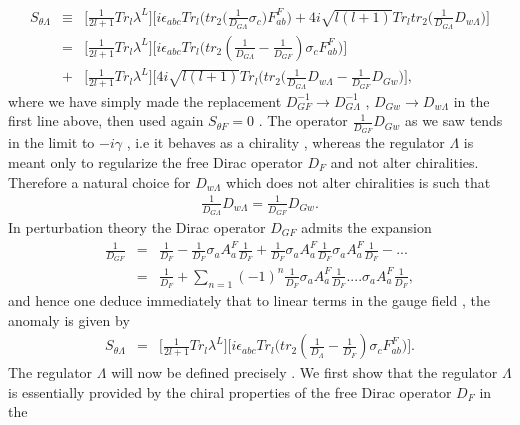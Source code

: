 \documentclass[a4paper,10pt]{article}
\begin{document}
\begin{eqnarray}
S_{\theta
\Lambda}&{\equiv}&\bigg[\frac{1}{2l+1}Tr_l{\lambda}^{L}\bigg]\bigg[i{\epsilon}_{abc}Tr_{l}\bigg(tr_2\big(\frac{1}{D_{G \Lambda }}{\sigma}_c)F_{ab}^F\bigg)+4i\sqrt{l(l+1)}Tr_ltr_2\big(\frac{1}{D_{G \Lambda }}D_{w \Lambda }\big)\bigg]\nonumber\\
&=&\bigg[\frac{1}{2l+1}Tr_l{\lambda}^{L}\bigg]\bigg[i{\epsilon}_{abc}Tr_{l}\bigg(tr_2(\frac{1}{D_{G \Lambda }}-\frac{1}{D_{GF}}){\sigma}_cF_{ab}^F\bigg)\bigg]\nonumber\\
&+&\bigg[\frac{1}{2l+1}Tr_l{\lambda}^{L}\bigg]\bigg[4i\sqrt{l(l+1)}Tr_{l}\bigg(tr_2\bigg(\frac{1}{D_{G\Lambda}}D_{w\Lambda}-\frac{1}{D_{GF}}D_{Gw}\bigg)\bigg],
\label{Lamb}\nonumber
\end{eqnarray}
where we have simply made the replacement
$D_{GF}^{-1}{\longrightarrow}D_{G\Lambda}^{-1}$ , $D_{Gw}{\longrightarrow}D_{w\Lambda }$ in the first line
above, then used again $S_{\theta F}=0$ . The operator $\frac{1}{D_{GF}}D_{Gw}$ as we saw tends in the limit to $-i{\gamma}$ , i.e it behaves as a chirality , whereas the regulator $\Lambda$ is meant only to regularize the free Dirac operator $D_F$ and not  alter chiralities. Therefore a natural choice for $D_{w\Lambda}$ which does not alter chiralities is such that
\begin{eqnarray}
\frac{1}{D_{G\Lambda }}D_{w\Lambda}=\frac{1}{D_{GF}}D_{Gw}.\nonumber
\end{eqnarray}
In perturbation theory
the Dirac operator $D_{GF}$ admits the expansion
\begin{eqnarray}
\frac{1}{D_{GF}}&=&\frac{1}{D_{F}}-\frac{1}{D_F}{\sigma}_aA_a^F\frac{1}{D_F}+\frac{1}{D_F}{\sigma}_aA_a^F\frac{1}{D_F}{\sigma}_aA_a^F\frac{1}{D_F}-...\nonumber\\
&=&\frac{1}{D_F}+\sum_{n=1}(-1)^n\frac{1}{D_F}{\sigma}_aA_a^F\frac{1}{D_F}....{\sigma}_aA_a^F\frac{1}{D_F},\nonumber
\end{eqnarray}
and hence one deduce immediately that to linear terms in the gauge field \cite{nagao1}, the anomaly is given by
\begin{eqnarray}
S_{\theta
\Lambda}
&=&\bigg[\frac{1}{2l+1}Tr_l{\lambda}^{L}\bigg]\bigg[i{\epsilon}_{abc}Tr_{l}\bigg(tr_2(\frac{1}{D_{\Lambda }}-\frac{1}{D_{F}}){\sigma}_cF_{ab}^F\bigg)\bigg].
\label{Lamb}
\end{eqnarray}
The regulator ${\Lambda}$ will now be defined precisely . We
first show that the regulator ${\Lambda}$ is essentially provided
by the chiral properties of the free Dirac operator $D_F$ in the
\end{document}
